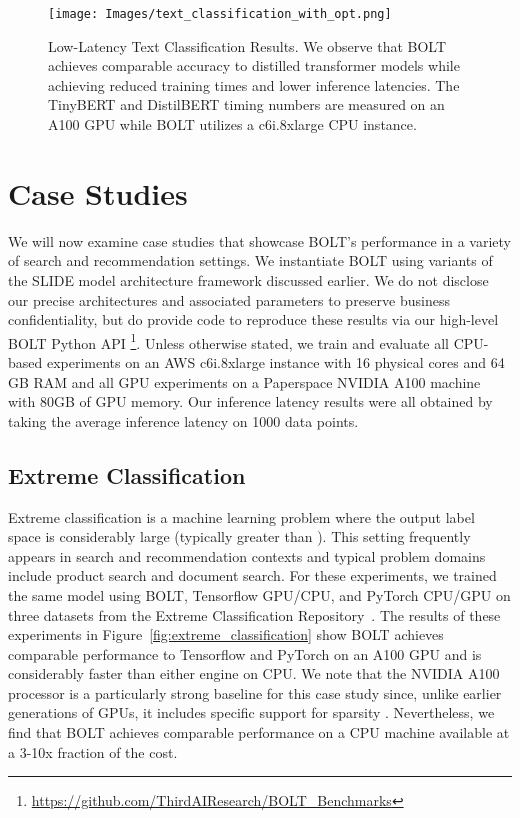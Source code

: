\documentclass[sigconf]{acmart}
\begin{document}
\begin{figure*}[t]
    \centering
    \texttt{[image: Images/text\_classification\_with\_opt.png]}
    \vspace{-0.7cm}
    \caption{Low-Latency Text Classification Results. We observe that BOLT achieves comparable accuracy to distilled transformer models while achieving reduced training times and lower inference latencies. The TinyBERT and DistilBERT timing numbers are measured on an A100 GPU while BOLT utilizes a c6i.8xlarge CPU instance.}
    \label{fig:text_classification}
\end{figure*}













\section{Case Studies}

We will now examine case studies that showcase BOLT's performance in a variety of search and recommendation settings. We instantiate BOLT using variants of the SLIDE model architecture framework discussed earlier. We do not disclose our precise architectures and associated parameters to preserve business confidentiality, but do provide code to reproduce these results via our high-level BOLT Python API \footnote{\url{https://github.com/ThirdAIResearch/BOLT_Benchmarks}}. Unless otherwise stated, we train and evaluate all CPU-based experiments on an AWS c6i.8xlarge instance with 16 physical cores and 64 GB RAM and all GPU experiments on a Paperspace NVIDIA A100 machine with 80GB of GPU memory. Our inference latency results were all obtained by taking the average inference latency on 1000 data points.

\subsection{Extreme Classification}

Extreme classification is a machine learning problem where the output label space is considerably large (typically greater than ). This setting frequently appears in search and recommendation contexts and typical problem domains include product search and document search. For these experiments, we trained the same model using BOLT, Tensorflow GPU/CPU, and PyTorch CPU/GPU on three datasets from the Extreme Classification Repository~\cite{Bhatia16}. The results of these experiments in Figure~\ref{fig:extreme_classification} show BOLT achieves comparable performance to Tensorflow and PyTorch on an A100 GPU and is considerably faster than either engine on CPU. We note that the NVIDIA A100 processor is a particularly strong baseline for this case study since, unlike earlier generations of GPUs, it includes specific support for sparsity \cite{nvidia-sparsity}. Nevertheless, we find that BOLT achieves comparable performance on a CPU machine available at a 3-10x fraction of the cost. 
\end{document}
